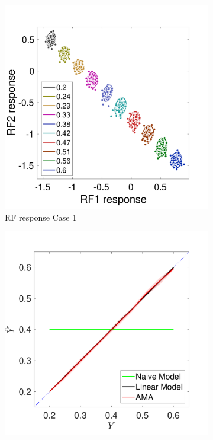 \documentclass{jov}
\begin{document}
\begin{figure}
\centering
        \begin{subfigure}[b]{0.3 \textwidth}
        \includegraphics[width=\textwidth]{../Figures/Figure9/Figure9_a.pdf}
        \caption{RF response Case 1}
        \label{fig:case1RFResponse}
    \end{subfigure}    
            \begin{subfigure}[b]{0.297 \textwidth}
        \includegraphics[width=\textwidth]{../Figures/Figure9/Figure9_b.pdf}

\end{subfigure}
\end{figure}
\end{document}
